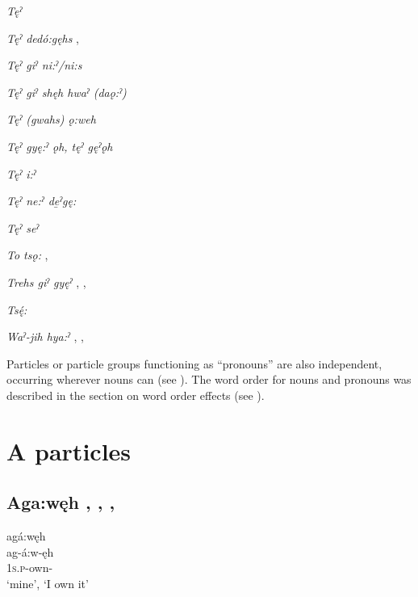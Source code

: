 \begin{multicols}{2}
\textit{Tęˀ} 

\textit{Tęˀ dedó:gęhs} , 

\textit{Tęˀ giˀ ni:ˀ/ni:s} 

\textit{Tęˀ giˀ shęh hwaˀ (daǫ:ˀ)} 

\textit{Tęˀ (gwahs) ǫ:weh} 

\textit{Tęˀ gyę:ˀ ǫh, tęˀ gęˀǫh} 

\textit{Tęˀ i:ˀ} 

\textit{Tęˀ ne:ˀ de̱ˀgę:} 

\textit{Tęˀ seˀ} 

\textit{To tsǫ:} , 

\textit{Trehs giˀ gyęˀ} , , 

\textit{Tsę́:} 

\textit{Waˀ-jih hya:ˀ} , , 

\end{multicols}

\z



Particles or particle groups functioning as “pronouns” are also independent, occurring wherever nouns can (see ). The word order for nouns and pronouns was described in the section on word order effects (see ).

\section{A particles}

\subsection*{\textbf{Aga:węh} , , , } \label{p:[aga:węh]}


\ea
\label{ex:apart1}
agá:węh\\
\gll ag-á:w-ęh\\
\textsc{1s.p}-own-{\stative}\\
\glt ‘mine’, ‘I own it’
\z




